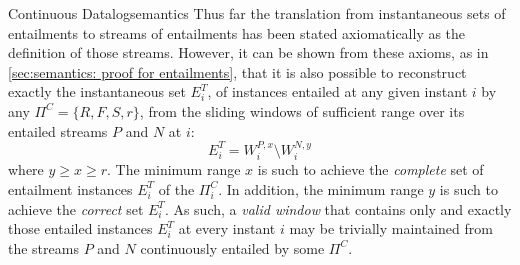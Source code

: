 \begin{nestedsection}{Continuous Datalog}{semantics}
Thus far the translation from instantaneous sets of entailments to
streams of entailments has been stated axiomatically as the definition
of those streams.  However, it can be shown from these axioms, as in
\ref{sec:semantics: proof for entailments}, that it is also possible
to reconstruct exactly the instantaneous set $E^T_{i}$, of instances
entailed at any given instant $i$ by any $\Pi^C = \{ R, F, S, r \}$,
from the sliding windows of sufficient range over its entailed streams
$P$ and $N$ at $i$:
\[ E^T_{i} = W^{P,x}_{i} \setminus W^{N,y}_{i} \]
where ${y \geq x \geq r}$. The minimum range $x$ is such to achieve
the \emph{complete} set of entailment instances $E^T_{i}$ of the
$\Pi^C_{i}$. In addition, the minimum range $y$ is such to achieve the
\emph{correct} set $E^T_{i}$. As such, a \emph{valid window} that
contains only and exactly those entailed instances $E^T_{i}$ at every
instant $i$ may be trivially maintained from the streams $P$ and $N$
continuously entailed by some $\Pi^C$.








\end{nestedsection}
